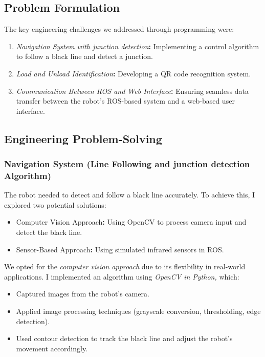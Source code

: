 \documentclass[../../main]{subfiles}
\begin{document}
\subsection{Problem Formulation}

The key engineering challenges we addressed through programming were:

\begin{enumerate}
\def\labelenumi{\arabic{enumi}.}
\item
  \emph{Navigation System with junction detection}\textbf{:}
  Implementing a control algorithm to follow a black line and detect a
  junction.
\item
  \emph{Load and Unload Identification}\textbf{:} Developing a QR code
  recognition system.
\item
  \emph{Communication Between ROS and Web Interface}\textbf{:} Ensuring
  seamless data transfer between the robot's ROS-based system and a
  web-based user interface.
\end{enumerate}

\subsection{Engineering Problem-Solving}

\subsubsection{Navigation System (Line Following and junction detection Algorithm)}

The robot needed to detect and follow a black line accurately. To
achieve this, I explored two potential solutions:

\begin{itemize}
\item
  Computer Vision Approach\textbf{:} Using OpenCV to process camera
  input and detect the black line.
\item
  Sensor-Based Approach\textbf{:} Using simulated infrared sensors in
  ROS.
\end{itemize}

We opted for the \emph{computer vision approach} due to its flexibility
in real-world applications. I implemented an algorithm using
\emph{OpenCV in Python,} which:

\begin{itemize}
\item
  Captured images from the robot's camera.
\item
  Applied image processing techniques (grayscale conversion,
  thresholding, edge detection).
\item
  Used contour detection to track the black line and adjust the robot's
  movement accordingly.
\end{itemize}
\end{document}
